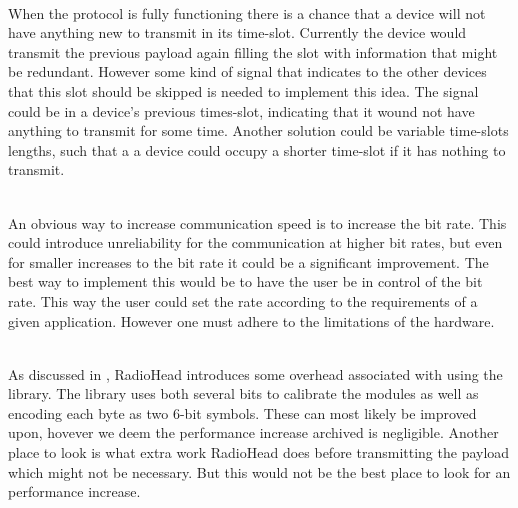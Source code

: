 \begin{description}[labelindent=\parindent]
    \item [Skip unnecessary transmissions]\hfill\\
When the protocol is fully functioning there is a chance that a device will not have anything new to transmit in its time-slot.
Currently the device would transmit the previous payload again filling the slot with information that might be redundant.
However some kind of signal that indicates to the other devices that this slot should be skipped is needed to implement this idea.
The signal could be in a device's previous times-slot, indicating that it wound not have anything to transmit for some time. 
Another solution could be variable time-slots lengths, such that a a device could occupy a shorter time-slot if it has nothing to transmit. 

    \item[Increase the bit rate]\hfill\\ 
An obvious way to increase communication speed is to increase the bit rate.
This could introduce unreliability for the communication at higher bit rates, but even for smaller increases to the bit rate it could be a significant improvement.
The best way to implement this would be to have the user be in control of the bit rate.
This way the user could set the rate according to the requirements of a given application.
However one must adhere to the limitations of the hardware.

    \item[Reduce overhead]\hfill\\
As discussed in , RadioHead introduces some overhead associated with using the library.
The library uses both several bits to calibrate the modules as well as encoding each byte as two 6-bit symbols.
These can most likely be improved upon, hovever we deem the performance increase archived is negligible.
Another place to look is what extra work RadioHead does before transmitting the payload which might not be necessary.
But this would not be the best place to look for an performance increase.
\end{description}

